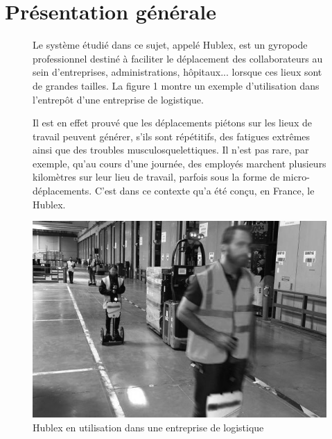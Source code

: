 

\section*{Présentation générale}

\begin{figure}[ht!]
 \begin{minipage}{0.6\linewidth}
 Le système étudié dans ce sujet, appelé Hublex, est un gyropode professionnel destiné à faciliter le déplacement des collaborateurs au sein d'entreprises, administrations, hôpitaux... lorsque ces lieux sont de grandes tailles. La figure 1 montre un exemple d'utilisation dans l'entrepôt d'une entreprise de logistique.

Il est en effet prouvé que les déplacements piétons sur les lieux de travail peuvent générer, s'ils sont répétitifs, des fatigues extrêmes ainsi que des troubles musculosquelettiques. Il n'est pas rare, par exemple, qu'au cours d'une journée, des employés marchent plusieurs kilomètres sur leur lieu de travail, parfois sous la forme de micro-déplacements. C'est dans ce contexte qu'a été conçu, en France, le Hublex.
 \end{minipage}\hfill
 \begin{minipage}{0.35\linewidth}
 \includegraphics[width=\linewidth]{img/fig01}
 \caption{\label{fig01}Hublex en utilisation dans une entreprise de logistique}
 \end{minipage}
\end{figure}

